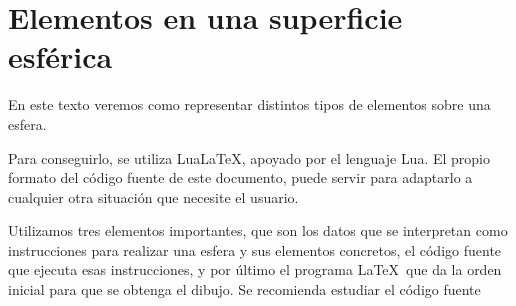 %

\chapter{Elementos en una superficie esférica}

En este texto veremos como representar distintos tipos de elementos sobre una esfera.

Para conseguirlo, se utiliza Lua\LaTeX , apoyado por el lenguaje \textsf{Lua}.
El propio formato del código fuente de este documento, puede servir para adaptarlo a
cualquier otra situación que necesite el usuario.

Utilizamos tres elementos importantes, que son los datos que se interpretan como
instrucciones para realizar una esfera y sus elementos concretos, el código fuente que
ejecuta esas instrucciones, y por último el programa \LaTeX\ que da la orden inicial para
que se obtenga el dibujo.   Se recomienda estudiar el código fuente

